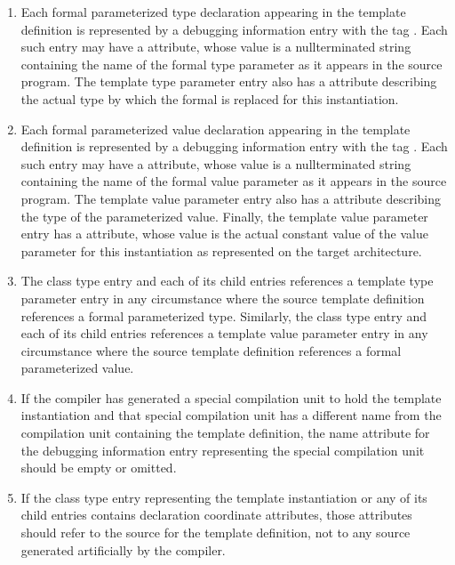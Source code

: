 \begin{enumerate}[1.]
\item Each formal parameterized type declaration appearing in the
template definition is represented by a debugging information
entry with the tag . Each
such entry may have a  attribute, whose value is
a null\dash terminated string containing the name of the formal
type parameter as it appears in the source program. The
template type parameter entry also has a  attribute
describing the actual type by which the formal is replaced
for this instantiation.

\item Each formal parameterized value declaration appearing in the
template definition is represented by a debugging information
entry with the 
tag . 
Each
such entry may have a  attribute, whose value is
a null\dash terminated string containing the name of the formal
value parameter as it appears in the source program. The
template value parameter entry also has a  attribute
describing the type of the parameterized value. Finally,
the template value parameter entry has a 
attribute, whose value is the actual constant value of the
value parameter for this instantiation as represented on the
target architecture.

\item The class type entry and each of its child entries references
a template type parameter entry in any circumstance where the
source template definition references a formal parameterized
type. Similarly, the class type entry and each of its child
entries references a template value parameter entry in any
circumstance where the source template definition references
a formal parameterized value.

\item If the compiler has generated a special compilation unit to
hold the template instantiation and that special compilation
unit has a different name from the compilation unit containing
the template definition, the name attribute for the debugging
information entry representing the special compilation unit
should be empty or omitted.

\item If the class type entry representing the template
instantiation or any of its child entries contains declaration
coordinate attributes, those attributes should refer to
the source for the template definition, not to any source
generated artificially by the compiler.
\end{enumerate}


